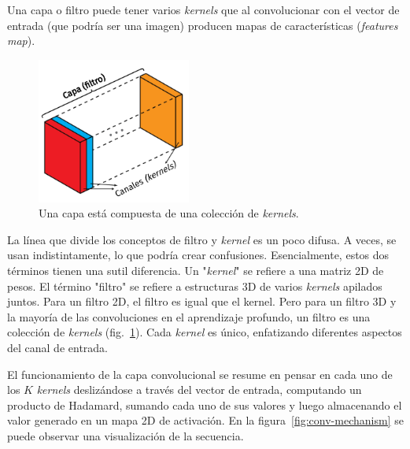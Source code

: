 \documentclass[a4paper,12pt]{article}
\begin{document}
Una capa o filtro puede tener varios \textit{kernels} que al convolucionar con el vector de entrada (que podría ser una imagen) producen mapas de características (\textit{features map}).

\begin{figure}[H]
	\begin{center}				
		\includegraphics[width=0.45\textwidth]{layer-kernels.png}
		\caption{Una capa está compuesta de una colección de \textit{kernels}.}
		\label{fig:layer-kernel}
	\end{center}
\end{figure}

La línea que divide los conceptos de filtro y \textit{kernel} es un poco difusa. A veces, se usan indistintamente, lo que podría crear confusiones. Esencialmente, estos dos términos tienen una sutil diferencia. Un "\textit{kernel}" se refiere a una matriz 2D de pesos. El término "filtro" se refiere a estructuras 3D de varios \textit{kernels} apilados juntos. Para un filtro 2D, el filtro es igual que el kernel. Pero para un filtro 3D y la mayoría de las convoluciones en el aprendizaje profundo, un filtro es una colección de \textit{kernels} (fig.~\ref{fig:layer-kernel}). Cada \textit{kernel} es único, enfatizando diferentes aspectos del canal de entrada.

\clearpage

El funcionamiento de la capa convolucional se resume en pensar en cada uno de los $K$ \textit{kernels} deslizándose a través del vector de entrada, computando un producto de Hadamard, sumando cada uno de sus valores y luego almacenando el valor generado en un mapa 2D de activación. En la figura~\ref{fig:conv-mechanism} se puede observar una visualización de la secuencia.
\end{document}
